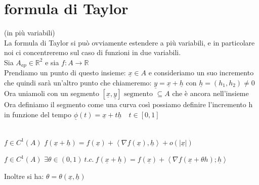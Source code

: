 \documentclass[a4paper, oneside]{article}
\begin{document}
\section{formula di Taylor}(in più variabili)\\
    La formula di Taylor si può ovviamente estendere a più variabili, e in particolare noi ci concentreremo sul caso di funzioni in due variabili.\\
        Sia $A_{ap} \in \mathbb{R}^2$ e sia $f:A\to \mathbb{R}$\\
        Prendiamo un punto di questo insieme: $\underline{x} \in A$ e consideriamo un suo incremento che quindi sarà un'altro punto che chiameremo: $\underline{y} = \underline{x} + \underline{h}$ con $\underline{h} = (h_1,h_2) \neq 0$\\
        Ora uniamoli con un segmento $[\underline{x}, \underline{y}] \text{ segmento } \subseteq A$ che è ancora nell'insieme\\
        Ora definiamo il segmento come una curva così possiamo definire l'incremento h in funzione del tempo $\underline{\phi}(t) = \underline{x} + t \underline{h} \quad t \in [0,1]$\\
        \hfill\\
        \begin{theorem}
             $f \in C^1(A)$  $f(\underline{x}+\underline{h}) = f(\underline{x}) + \left\langle \nabla f(\underline{x}), \underline{h}\right\rangle  + o(|\underline{x}|)$
        \end{theorem}
        \begin{theorem}
             $f \in C^1(A)$  $\exists\theta \in (0,1) \ t.c. \ f(\underline{x} + \underline{h}) = f(\underline{x}) + \left\langle \nabla f(\underline{x} + \theta h); \underline{h}\right\rangle $
        \end{theorem}
        \begin{observation}
            Inoltre si ha: $\theta = \theta(\underline{x}, \underline{h})$
        \end{observation}
\end{document}
